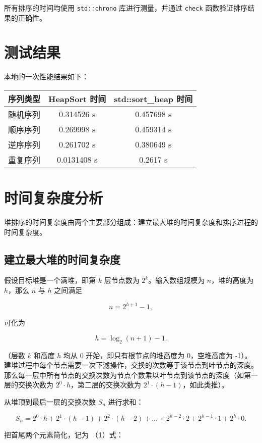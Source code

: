 \documentclass[UTF8]{ctexart}
\begin{document}
所有排序的时间均使用 \texttt{std::chrono} 库进行测量，并通过 \texttt{check} 函数验证排序结果的正确性。

\section{测试结果}
本地的一次性能结果如下：

\begin{center}
\begin{tabular}{|c|c|c|}
\hline
序列类型 & HeapSort 时间 & std::sort\_heap 时间 \\
\hline
随机序列 & 0.314526 s & 0.457698 s \\
\hline
顺序序列 & 0.269998 s & 0.459314 s \\
\hline
逆序序列 & 0.261702 s & 0.380649 s \\
\hline
重复序列 & 0.0131408 s & 0.2617 s \\
\hline
\end{tabular}
\end{center}

\section{时间复杂度分析}
堆排序的时间复杂度由两个主要部分组成：建立最大堆的时间复杂度和排序过程的时间复杂度。

\subsection{建立最大堆的时间复杂度}
假设目标堆是一个满堆，即第 $k$ 层节点数为 $2^k$。输入数组规模为 $n$，堆的高度为 $h$，那么 $n$ 与 $h$ 之间满足

$$
n = 2^{h + 1} - 1,
$$

可化为 

$$
h = \log_2(n + 1) - 1. 
$$

（层数 $k$ 和高度 $h$ 均从 0 开始，即只有根节点的堆高度为 0，空堆高度为 -1）。建堆过程中每个节点需要一次下滤操作，交换的次数等于该节点到叶节点的深度。那么每一层中所有节点的交换次数为节点个数乘以叶节点到该节点的深度（如第一层的交换次数为 $2^0 \cdot h$，第二层的交换次数为 $2^1 \cdot (h - 1)$，如此类推）。

从堆顶到最后一层的交换次数 $S_n$ 进行求和：

$$
S_n = 2^0 \cdot h + 2^1 \cdot (h - 1) + 2^2 \cdot (h - 2) + \ldots + 2^{h-2} \cdot 2 + 2^{h-1} \cdot 1 + 2^h \cdot 0.
$$

把首尾两个元素简化，记为 （\textbf{1}）式：
\end{document}
